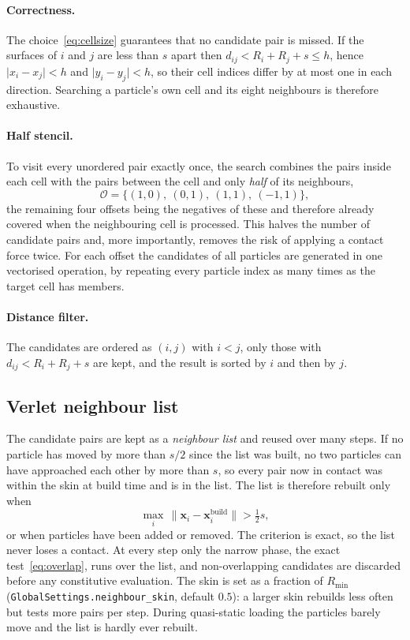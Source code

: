 \paragraph{Correctness.}  The choice~\eqref{eq:cellsize} guarantees that no
candidate pair is missed.  If the surfaces of $i$ and $j$ are less than $s$
apart then $d_{ij}<R_{i}+R_{j}+s\le h$, hence $\lvert x_{i}-x_{j}\rvert<h$ and
$\lvert y_{i}-y_{j}\rvert<h$, so their cell indices differ by at most one in
each direction.  Searching a particle's own cell and its eight neighbours is
therefore exhaustive.

\paragraph{Half stencil.}  To visit every unordered pair exactly once, the
search combines the pairs inside each cell with the pairs between the cell and
only \emph{half} of its neighbours,
\begin{equation}
  \mathcal{O} = \bigl\{(1,0),\ (0,1),\ (1,1),\ (-1,1)\bigr\},
  \label{eq:stencil}
\end{equation}
the remaining four offsets being the negatives of these and therefore already
covered when the neighbouring cell is processed.  This halves the number of
candidate pairs and, more importantly, removes the risk of applying a contact
force twice.  For each offset the candidates of all particles are generated in
one vectorised operation, by repeating every particle index as many times as the
target cell has members.

\paragraph{Distance filter.}  The candidates are ordered as $(i,j)$ with $i<j$,
only those with $d_{ij}<R_{i}+R_{j}+s$ are kept, and the result is sorted by $i$
and then by $j$.

\subsection{Verlet neighbour list}
\label{sec:verlet}

The candidate pairs are kept as a \emph{neighbour list} and reused over many
steps.  If no particle has moved by more than $s/2$ since the list was built, no
two particles can have approached each other by more than $s$, so every pair now
in contact was within the skin at build time and is in the list.  The list is
therefore rebuilt only when
\begin{equation}
  \max_{i}\,\lVert\mathbf{x}_{i}-\mathbf{x}_{i}^{\text{build}}\rVert
  > \tfrac{1}{2}s ,
  \label{eq:rebuild}
\end{equation}
or when particles have been added or removed.  The criterion is exact, so the
list never loses a contact.  At every step only the narrow phase, the exact
test~\eqref{eq:overlap}, runs over the list, and non-overlapping candidates are
discarded before any constitutive evaluation.  The skin is set as a fraction of
$R_{\min}$ (\texttt{GlobalSettings.neighbour\_skin}, default $0.5$): a larger
skin rebuilds less often but tests more pairs per step.  During quasi-static
loading the particles barely move and the list is hardly ever rebuilt.

